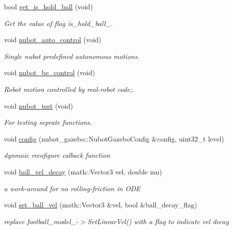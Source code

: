 \begin{DoxyCompactItemize}
bool \hyperlink{classgazebo_1_1NubotGazebo_a8366f268f6bba085201123d74b786368}{get\-\_\-is\-\_\-hold\-\_\-ball} (void)
\begin{DoxyCompactList}\small\item\em Get the value of flag is\-\_\-hold\-\_\-ball\-\_\-. \end{DoxyCompactList}\item 
void \hyperlink{classgazebo_1_1NubotGazebo_a991cc13697cbd1eaf855d21e4f5d78d2}{nubot\-\_\-auto\-\_\-control} (void)
\begin{DoxyCompactList}\small\item\em Single nubot predefined autonomous motions. \end{DoxyCompactList}\item 
void \hyperlink{classgazebo_1_1NubotGazebo_aaa7835337bbfd120b5b85af40ccf47ae}{nubot\-\_\-be\-\_\-control} (void)
\begin{DoxyCompactList}\small\item\em Robot motion controlled by real-\/robot code;. \end{DoxyCompactList}\item 
void \hyperlink{classgazebo_1_1NubotGazebo_a97e67cc6fc94f1644ffb5f3e1a9fa918}{nubot\-\_\-test} (void)
\begin{DoxyCompactList}\small\item\em For testing seprate functions. \end{DoxyCompactList}\item 
void \hyperlink{classgazebo_1_1NubotGazebo_a828269281839a4f18d30f02d20ad62b6}{config} (nubot\-\_\-gazebo\-::\-Nubot\-Gazebo\-Config \&config, uint32\-\_\-t level)
\begin{DoxyCompactList}\small\item\em dynmaic recofigure calback function \end{DoxyCompactList}\item 
void \hyperlink{classgazebo_1_1NubotGazebo_a3a42f8965b7ccb35d0b6a0624c56ba86}{ball\-\_\-vel\-\_\-decay} (math\-::\-Vector3 vel, double mu)
\begin{DoxyCompactList}\small\item\em a work-\/around for no rolling-\/friction in O\-D\-E \end{DoxyCompactList}\item 
void \hyperlink{classgazebo_1_1NubotGazebo_a5b5d4a3644867257cb379613072e9567}{set\-\_\-ball\-\_\-vel} (math\-::\-Vector3 \&vel, bool \&ball\-\_\-decay\-\_\-flag)
\begin{DoxyCompactList}\small\item\em replace football\-\_\-model\-\_\--\/$>$Set\-Linear\-Vel() with a flag to indicate vel decay \end{DoxyCompactList}\end{DoxyCompactItemize}
